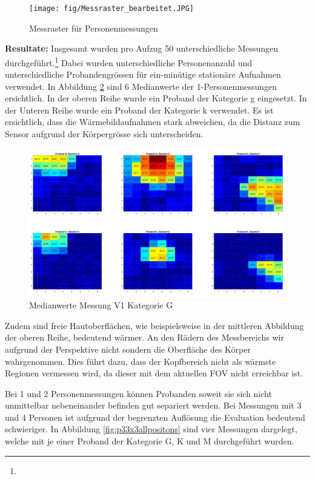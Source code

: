 \begin{figure}[H]
	\centering
	\texttt{[image: fig/Messraster\_bearbeitet.JPG]}
	\caption[Messraster für Personenmessungen]{Messraster für Personenmessungen}
	\label{fig:Messraster}
\end{figure}

\textbf{Resultate:} Insgesamt wurden pro Aufzug 50 unterschiedliche Messungen durchgeführt.\footnote[20]{} Dabei wurden unterschiedliche Personenanzahl und unterschiedliche Probandengrössen für ein-minütige stationäre Aufnahmen verwendet. In Abbildung \ref{fig:p1gallpositionsmean} sind 6 Medianwerte der 1-Personenmessungen ersichtlich. In der oberen Reihe wurde ein Proband der Kategorie g eingesetzt. In der Unteren Reihe wurde ein Proband der Kategorie k verwendet. Es ist ersichtlich, dass die Wärmebildaufnahmen stark abweichen, da die Distanz zum Sensor aufgrund der Körpergrösse sich unterscheiden.

\begin{figure}[H]
	\centering
	\includegraphics[width=1.0\textwidth]{fig/p1_k_g_aei.jpg}
	\caption[Medianwerte Messung V1 Kategorie G]{Medianwerte Messung V1 Kategorie G}
	\label{fig:p1gallpositionsmean}
\end{figure}

Zudem sind freie Hautoberflächen, wie beispielsweise in der mittleren Abbildung der oberen Reihe, bedeutend wärmer. An den Rädern des Messbereichs wir aufgrund der Perspektive nicht sondern die Oberfläche des Körper wahrgenommen. Dies führt dazu, dass der Kopfbereich nicht als wärmste Regionen vermessen wird, da dieser mit dem aktuellen \ac{FOV} nicht erreichbar ist.

Bei 1 und 2 Personenmessungen können Probanden soweit sie sich nicht unmittelbar nebeneinander befinden gut separiert werden. Bei Messungen mit 3 und 4 Personen ist aufgrund der begrenzten Auflösung die Evaluation bedeutend schwieriger. In Abbildung \ref{fig:p33x3allpositons} sind vier Messungen dargelegt, welche mit je einer Proband der Kategorie G, K und M durchgeführt wurden.


